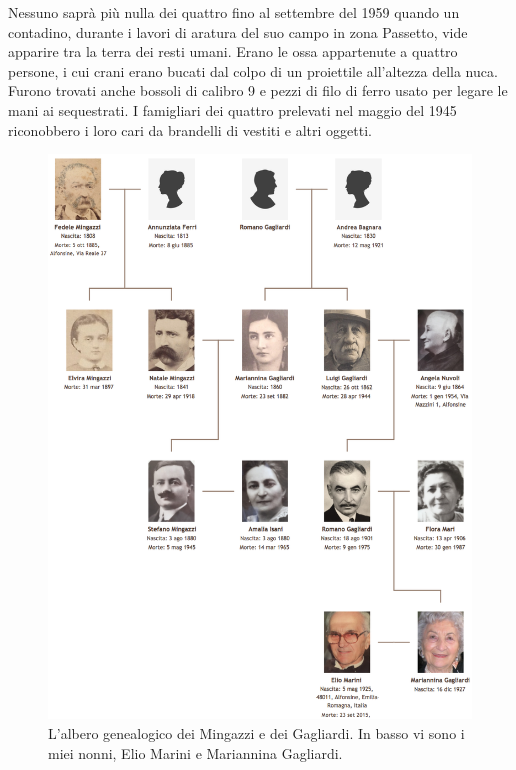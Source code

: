 Nessuno saprà più nulla dei quattro fino al settembre del 1959 quando un contadino, durante i lavori di aratura del suo campo in zona Passetto, vide apparire tra la terra dei resti umani. Erano le ossa appartenute a quattro persone, i cui crani erano bucati dal colpo di un proiettile all'altezza della nuca. Furono trovati anche bossoli di calibro 9 e pezzi di filo di ferro usato per legare le mani ai sequestrati. I famigliari dei quattro prelevati nel maggio del 1945 riconobbero i loro cari da brandelli di vestiti e altri oggetti.

 \begin{figure}[htb]
    \centering
    \includegraphics[width=\textwidth]{albero}
    \caption*{L'albero genealogico dei Mingazzi e dei Gagliardi. In basso vi sono i miei nonni, Elio Marini e Mariannina Gagliardi.}
\end{figure}
